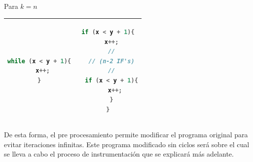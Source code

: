 \documentclass{llncs}
\begin{document}
Para \(k = n\)
\begin{table}
\centering
\begin{tabular}{|c | c|}
\hline
\begin{lstlisting}[language=Java]
while (x < y + 1){
  x++;
}
\end{lstlisting} & 
\begin{lstlisting}[language=Java]
if (x < y + 1){
  x++;
  //
  // (n-2 IF's)
  //
  if (x < y + 1){
    x++;
  }
}
\end{lstlisting}\\
\hline
\end{tabular}
\end{table}

De esta forma, el pre procesamiento permite modificar el programa original para evitar iteraciones infinitas.
Este programa modificado sin ciclos será sobre el cual se lleva a cabo el proceso de instrumentación que se explicará más adelante.


\end{document}
